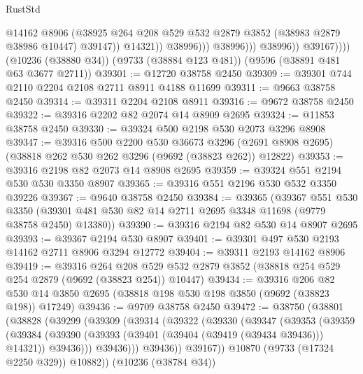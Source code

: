 \begin{lexlean}{RustStd}
\begin{coremodule}
{\begin{coremodule}
{{{{{{{{{{{{{{{{{{{{{{{{{{{{{{{{{{{{{{{{{{{{{{{{{{{{{{{                                  @14162
                                  @8906
                                  (@38925
                                    @264
                                    @208
                                    @529
                                    @532
                                    @2879
                                    @3852
                                    (@38983 @2879 @38986 @10447)
                                    @39147))
                                @14321))
                            @38996)))
                      @38996)))
                @38996))
            @39167))))
    (@10236 (@38880 @34))
    (@9733 (@38884 @123 @481))
    (@9596 (@38891 @481 @63 @3677 @2711))
@39301 := @12720 @38758 @2450
@39309 := @39301 @744 @2110 @2204 @2108 @2711 @8911 @4188 @11699
@39311 := @9663 @38758 @2450
@39314 := @39311 @2204 @2108 @8911
@39316 := @9672 @38758 @2450
@39322 := @39316 @2202 @82 @2074 @14 @8909 @2695
@39324 := @11853 @38758 @2450
@39330 := @39324 @500 @2198 @530 @2073 @3296 @8908
@39347 := @39316
    @500
    @2200
    @530
    @36673
    @3296
    (@2691 @8908 @2695)
    (@38818 @262 @530 @262 @3296 (@9692 (@38823 @262)) @12822)
@39353 := @39316 @2198 @82 @2073 @14 @8908 @2695
@39359 := @39324 @551 @2194 @530 @530 @3350 @8907
@39365 := @39316 @551 @2196 @530 @532 @3350 @39226
@39367 := @9640 @38758 @2450
@39384 := @39365
    (@39367
      @551
      @530
      @3350
      (@39301 @481 @530 @82 @14 @2711 @2695 @3348 @11698 (@9779 @38758 @2450) @13380))
@39390 := @39316 @2194 @82 @530 @14 @8907 @2695
@39393 := @39367 @2194 @530 @8907
@39401 := @39301 @497 @530 @2193 @14162 @2711 @8906 @3294 @12772
@39404 := @39311 @2193 @14162 @8906
@39419 := @39316
    @264
    @208
    @529
    @532
    @2879
    @3852
    (@38818 @254 @529 @254 @2879 (@9692 (@38823 @254)) @10447)
@39434 := @39316
    @206
    @82
    @530
    @14
    @3850
    @2695
    (@38818 @198 @530 @198 @3850 (@9692 (@38823 @198)) @17249)
@39436 := @9709 @38758 @2450
@39472 := @38750
    (@38801
      (@38828
        (@39299
          (@39309
            (@39314
              (@39322
                (@39330
                  (@39347
                    (@39353
                      (@39359
                        (@39384
                          (@39390
                            (@39393 (@39401 (@39404 (@39419 (@39434 @39436))) @14321))
                            @39436)))
                      @39436)))
                @39436))
            @39167))
        @10870
        (@9733 (@17324 @2250 @329))
        @10882))
    (@10236 (@38784 @34))
}}}}}}}}}}}}}}}}}}}}}}}}}}}}}}}}}}}}}}}}}}}}}}}}}}}}}}}
\end{coremodule}}
\end{coremodule}
\end{lexlean}
